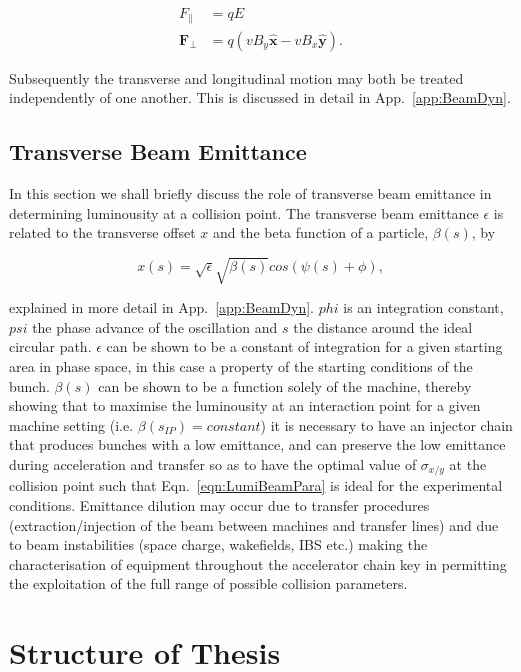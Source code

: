 \begin{align}
F_{\parallel} &= qE \\
\mathbf{F_{\perp}} &= q \left( vB_{y} \mathbf{\hat{x}} - vB_{x} \mathbf{\hat{y}} \right).
\end{align}

Subsequently the transverse and longitudinal motion may both be treated independently of one another. This is discussed in detail in App.~\ref{app:BeamDyn}.

\subsection{Transverse Beam Emittance}

In this section we shall briefly discuss the role of transverse beam emittance in determining luminousity at a collision point. The transverse beam emittance $\epsilon$ is related to the transverse offset $x$ and the beta function of a particle, $\beta (s)$, by 

\begin{equation}
x \left( s \right) = \sqrt{\epsilon} \sqrt{\beta \left( s \right) } cos \left( \psi \left( s \right) + \phi \right),
\end{equation}

explained in more detail in App.~\ref{app:BeamDyn}. $phi$ is an integration constant, $psi$ the phase advance of the oscillation and $s$ the distance around the ideal circular path. $\epsilon$ can be shown to be a constant of integration for a given starting area in phase space, in this case a property of the starting conditions of the bunch. $\beta (s)$ can be shown to be a function solely of the machine, thereby showing that to maximise the luminousity at an interaction point for a given machine setting (i.e. $\beta(s_{IP}) = constant$) it is necessary to have an injector chain that produces bunches with a low emittance, and can preserve the low emittance during acceleration and transfer so as to have the optimal value of $\sigma_{x/y}$ at the collision point such that Eqn.~\ref{eqn:LumiBeamPara} is ideal for the experimental conditions. Emittance dilution may occur due to transfer procedures (extraction/injection of the beam between machines and transfer lines) and due to beam instabilities (space charge, wakefields, IBS etc.) making the characterisation of equipment throughout the accelerator chain key in permitting the exploitation of the full range of possible collision parameters.

\section{Structure of Thesis}

